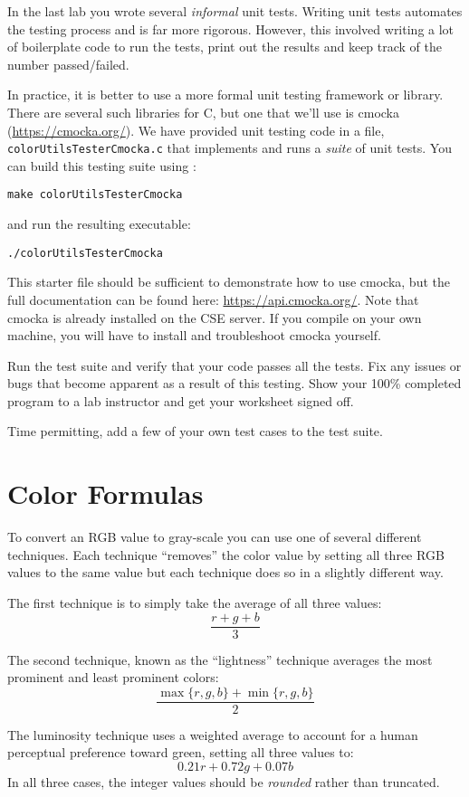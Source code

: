 \documentclass[12pt]{scrartcl}
\begin{document}
In the last lab you wrote several \emph{informal} unit tests.  
Writing unit tests automates the testing process and is far more
rigorous.  However, this involved writing a lot of boilerplate 
code to run the tests, print out the results and keep track 
of the number passed/failed.  

In practice, it is better to use a more formal unit testing framework
or library.  There are several such libraries for C, but one that 
we'll use is cmocka (\url{https://cmocka.org/}).  We have provided
unit testing code in a file, \texttt{colorUtilsTesterCmocka.c} 
that implements and runs a \emph{suite} of unit tests. You can 
build this testing suite using :

\texttt{make colorUtilsTesterCmocka}

and run the resulting executable:

\texttt{./colorUtilsTesterCmocka}

This starter file should be sufficient to demonstrate how to 
use cmocka, but the full documentation 
can be found here: \url{https://api.cmocka.org/}.  Note that cmocka 
is already installed on the CSE server.  If you compile on your own 
machine, you will have to install and troubleshoot cmocka yourself.  

Run the test suite and verify that your code passes all the tests.
Fix any issues or bugs that become apparent as a result of this
testing.  Show your 100\% completed program to a lab instructor
and get your worksheet signed off.

Time permitting, add a few of your own test cases to the test
suite.

\section*{Color Formulas}

To convert an RGB value to gray-scale you can use one of several
different techniques.  Each technique ``removes'' the color value by
setting all three RGB values to the same value but each technique 
does so in a slightly different way.

The first technique is to simply take the average of all three values:
  $$\frac{r + g + b}{3}$$

The second technique, known as the ``lightness'' technique averages 
the most prominent and least prominent colors:
  $$\frac{\max\{r, g, b\} + \min\{r, g, b\}}{2}$$

The luminosity technique uses a weighted average to account for a human 
perceptual preference toward green, setting all three values to:
  $$0.21 r + 0.72 g + 0.07 b$$
In all three cases, the integer values should be \emph{rounded} rather 
than truncated.
\end{document}
